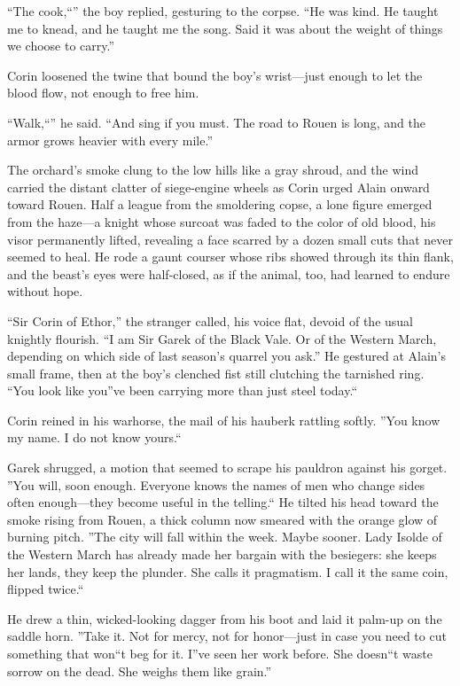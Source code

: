\documentclass[11pt,twoside]{book}
\begin{document}
``The cook,``'' the boy replied, gesturing to the corpse.  ``He was kind. He taught me to knead, and he taught me the song. Said it was about the weight of things we choose to carry.''

Corin loosened the twine that bound the boy's wrist---just enough to let the blood flow, not enough to free him.

``Walk,``'' he said.  ``And sing if you must.  The road to Rouen is long, and the armor grows heavier with every mile.''

The orchard's smoke clung to the low hills like a gray shroud, and the wind carried the distant clatter of siege-engine wheels as Corin urged Alain onward toward Rouen. Half a league from the smoldering copse, a lone figure emerged from the haze---a knight whose surcoat was faded to the color of old blood, his visor permanently lifted, revealing a face scarred by a dozen small cuts that never seemed to heal. He rode a gaunt courser whose ribs showed through its thin flank, and the beast's eyes were half-closed, as if the animal, too, had learned to endure without hope.

``Sir Corin of Ethor,'' the stranger called, his voice flat, devoid of the usual knightly flourish. ``I am Sir Garek of the Black Vale. Or of the Western March, depending on which side of last season's quarrel you ask.'' He gestured at Alain's small frame, then at the boy's clenched fist still clutching the tarnished ring. ``You look like you''ve been carrying more than just steel today.``

Corin reined in his warhorse, the mail of his hauberk rattling softly. ''You know my name. I do not know yours.``

Garek shrugged, a motion that seemed to scrape his pauldron against his gorget. ''You will, soon enough. Everyone knows the names of men who change sides often enough---they become useful in the telling.`` He tilted his head toward the smoke rising from Rouen, a thick column now smeared with the orange glow of burning pitch. ''The city will fall within the week. Maybe sooner. Lady Isolde of the Western March has already made her bargain with the besiegers: she keeps her lands, they keep the plunder. She calls it pragmatism. I call it the same coin, flipped twice.``

He drew a thin, wicked-looking dagger from his boot and laid it palm-up on the saddle horn. ''Take it. Not for mercy, not for honor---just in case you need to cut something that won``t beg for it. I''ve seen her work before. She doesn``t waste sorrow on the dead. She weighs them like grain.''
\end{document}
